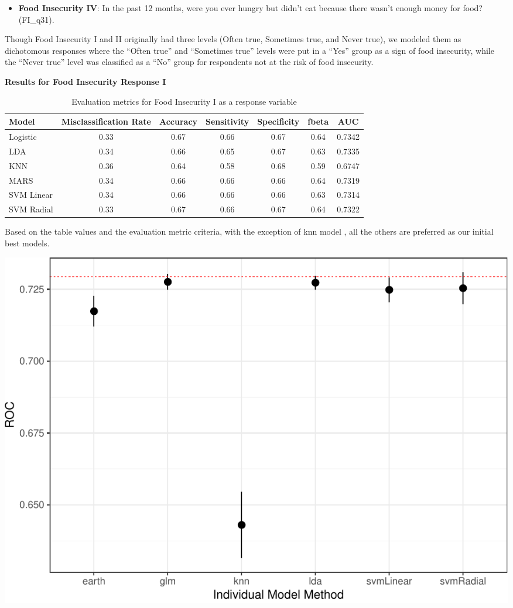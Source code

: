 \documentclass[
  10pt,
]{article}
\providecommand{\tightlist}{%
  \setlength{\itemsep}{0pt}\setlength{\parskip}{0pt}}
\begin{document}
\begin{itemize}
\tightlist
\item
  \textbf{Food Insecurity IV}: In the past 12 months, were you ever hungry but didn't eat because there wasn't enough money for food? (FI\_q31).
\end{itemize}

Though Food Insecurity I and II originally had three levels (Often true, Sometimes true, and Never true), we modeled them as dichotomous responses where the ``Often true'' and ``Sometimes true'' levels were put in a ``Yes'' group as a sign of food insecurity, while the ``Never true'' level was classified as a ``No'' group for respondents not at the risk of food insecurity.

\textbf{Results for Food Insecurity Response I}

\begin{table}[H]

\caption{\label{tab:unnamed-chunk-17}Evaluation metrics for Food Insecurity I  as a response variable}
\centering
\fontsize{12}{14}\selectfont
\begin{tabular}[t]{lcccccc}
\toprule
Model & Misclassification Rate & Accuracy & Sensitivity & Specificity & fbeta & AUC\\
\midrule
Logistic & 0.33 & 0.67 & 0.66 & 0.67 & 0.64 & 0.7342\\
LDA & 0.34 & 0.66 & 0.65 & 0.67 & 0.63 & 0.7335\\
KNN & 0.36 & 0.64 & 0.58 & 0.68 & 0.59 & 0.6747\\
MARS & 0.34 & 0.66 & 0.66 & 0.66 & 0.64 & 0.7319\\
SVM Linear & 0.34 & 0.66 & 0.66 & 0.66 & 0.63 & 0.7314\\
SVM Radial & 0.33 & 0.67 & 0.66 & 0.67 & 0.64 & 0.7322\\
\bottomrule
\end{tabular}
\end{table}

Based on the table values and the evaluation metric criteria, with the exception of knn model , all the others are preferred as our initial best models.\\

\begin{center}\includegraphics{final_phase2_report_files/figure-latex/unnamed-chunk-18-1} \end{center}
\end{document}
